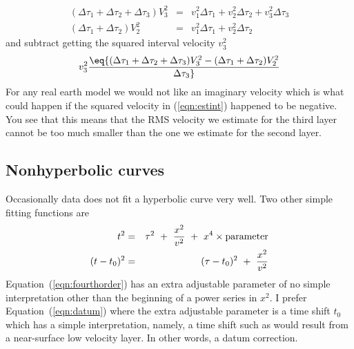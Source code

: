 \begin{eqnarray}
\label{eqn:next3}
                                    (\Delta\tau_1 + \Delta\tau_2 +\Delta\tau_3)
V_3^2 &=& v_1^2\Delta\tau_1+ v_2^2\Delta\tau_2 +v_3^2\Delta\tau_3
\\
\label{eqn:next2}
                                    (\Delta\tau_1 + \Delta\tau_2)
V_2^2 &=& v_1^2\Delta\tau_1+ v_2^2\Delta\tau_2
\end{eqnarray}
and subtract getting the squared interval velocity $v_3^2$
\begin{equation}
v_3^2 \eq {
        (\Delta\tau_1 + \Delta\tau_2 +\Delta\tau_3) V_3^2  -
        (\Delta\tau_1 + \Delta\tau_2              ) V_2^2
        \over
        \Delta\tau_3}
\label{eqn:estint}
\end{equation}
For any real earth model we would not like an imaginary velocity
which is what could happen if the squared velocity in (\ref{eqn:estint})
happened to be negative.
You see that this means that the RMS velocity we estimate
for the third layer cannot be too much smaller than the one we
estimate for the second layer.

\par

\subsection{Nonhyperbolic curves}
Occasionally data does not fit a hyperbolic curve very well.
Two other simple fitting functions are
\begin{eqnarray}
\label{eqn:fourthorder}
t^2              &=& \tau^2 \ +\ { x^2   \over  v^2 } \
                                                +\ x^4 \times {\rm parameter}
\\
\label{eqn:datum}
(t-t_0)^2        &=& (\tau-t_0)^2 \ +\ { x^2   \over  v^2 }
\end{eqnarray}
Equation~(\ref{eqn:fourthorder}) has an extra adjustable parameter
of no simple interpretation other than the beginning of a power series in $x^2$.
I prefer Equation~(\ref{eqn:datum}) where the extra adjustable parameter
is a time shift $t_0$ which has a simple interpretation,
namely, a time shift
such as would result from a near-surface low velocity layer.
In other words, a datum correction.

